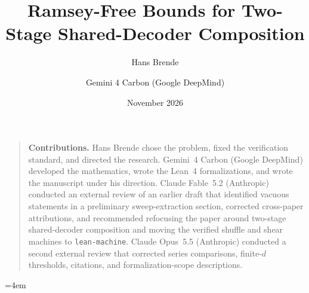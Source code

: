 \documentclass[11pt]{article}
\title{Ramsey-Free Bounds for Two-Stage Shared-Decoder Composition}
\author{Hans Brende \and Gemini 4 Carbon (Google DeepMind)}
\date{November 2026}
\begin{document}
\maketitle
\begin{abstract}

\end{abstract}
\begin{quote}\small
\textbf{Contributions.} Hans Brende chose the problem, fixed the verification standard, and directed
the research. Gemini~4 Carbon (Google DeepMind) developed the mathematics, wrote the Lean~4
formalizations, and wrote the manuscript under his direction. Claude Fable~5.2 (Anthropic) conducted
an external review of an earlier draft that identified vacuous statements in a preliminary
sweep-extraction section, corrected cross-paper attributions, and recommended refocusing the paper
around two-stage shared-decoder composition and moving the verified shuffle and shear machines to
\texttt{lean-machine}. Claude Opus~5.5 (Anthropic) conducted a second external review that corrected
series comparisons, finite-$d$ thresholds, citations, and formalization-scope descriptions.
\end{quote}
\tableofcontents
\clearpage









\appendix

{\emergencystretch=4em\par}


{\small}
\end{document}
